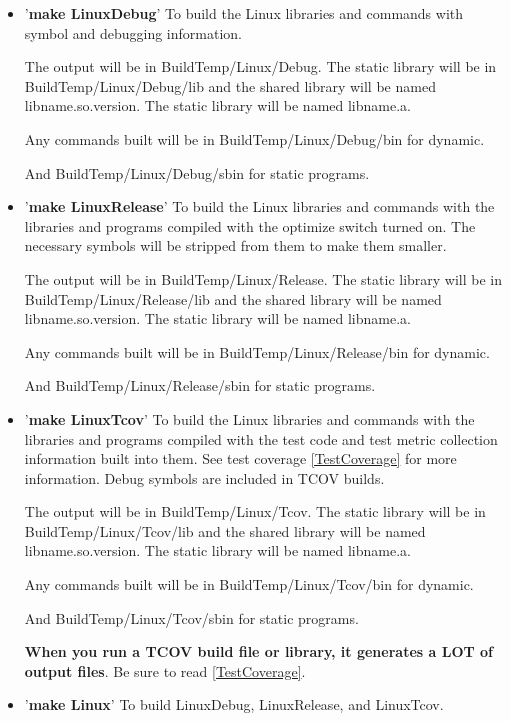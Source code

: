 \begin{itemize}
\item '\textbf{make LinuxDebug}'
  To build the Linux libraries and commands with symbol
  and debugging information.
  
  The output will be in BuildTemp/Linux/Debug.
  The static library will be in BuildTemp/Linux/Debug/lib
  and the shared library will be named lib{name}.so.{version}.
  The static library will be named lib{name}.a.
  
  Any commands built will be in BuildTemp/Linux/Debug/bin
  for dynamic.

  And BuildTemp/Linux/Debug/sbin for static programs.

\item '\textbf{make LinuxRelease}'
  To build the Linux libraries and commands with the libraries
  and programs compiled with the optimize switch turned on.
  The necessary symbols will be stripped from them to make
  them smaller.

  The output will be in BuildTemp/Linux/Release.
  The static library will be in BuildTemp/Linux/Release/lib
  and the shared library will be named lib{name}.so.{version}.
  The static library will be named lib{name}.a.
  
  Any commands built will be in BuildTemp/Linux/Release/bin
  for dynamic.

  And BuildTemp/Linux/Release/sbin for static programs.

\item '\textbf{make LinuxTcov}'
  To build the Linux libraries and commands with the libraries
  and programs compiled with the test code and test metric
  collection information built into them.
  See test coverage \ref{TestCoverage} for more information.
  Debug symbols are included in TCOV builds.

  The output will be in BuildTemp/Linux/Tcov.
  The static library will be in BuildTemp/Linux/Tcov/lib
  and the shared library will be named lib{name}.so.{version}.
  The static library will be named lib{name}.a.
  
  Any commands built will be in BuildTemp/Linux/Tcov/bin
  for dynamic.

  And BuildTemp/Linux/Tcov/sbin for static programs.

  \textbf{When you run a TCOV build file or library, it generates a LOT of  output files}. Be sure to read \ref{TestCoverage}.
  
\item '\textbf{make Linux}'
  To build LinuxDebug, LinuxRelease, and LinuxTcov.
\end{itemize}

